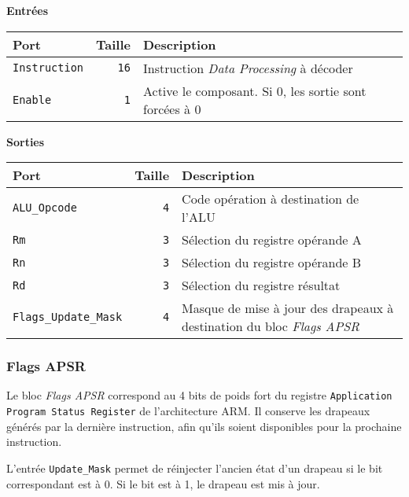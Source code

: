 
\textbf{Entrées}\\

\begin{tabular}{|l|r|l|}
\hline
\textbf{Port}		& \textbf{Taille} & \textbf{Description}\\
\hline

\texttt{Instruction}	& \texttt{16} & Instruction \textit{Data Processing} à décoder\\
\hline
\texttt{Enable}		&  \texttt{1} & Active le composant. Si 0, les sortie sont forcées à 0\\


\hline
\end{tabular}

\vspace{1em}
\textbf{Sorties}\\

\begin{tabular}{|l|r|l|}
\hline 
\textbf{Port} & \textbf{Taille} & \textbf{Description}\\
\hline

\texttt{ALU\_Opcode}		&  \texttt{4} & Code opération à destination de l'ALU\\
\hline
\texttt{Rm}			&  \texttt{3} & Sélection du registre opérande A\\
\hline
\texttt{Rn}			&  \texttt{3} & Sélection du registre opérande B\\
\hline
\texttt{Rd}			&  \texttt{3} & Sélection du registre résultat\\
\hline
\texttt{Flags\_Update\_Mask}	&  \texttt{4} & Masque de mise à jour des drapeaux à destination du bloc \textit{Flags APSR}\\

\hline
\end{tabular}




\subsubsection{Flags APSR}



Le bloc \textit{Flags APSR} correspond au 4 bits de poids fort du registre \texttt{Application Program Status Register} de l'architecture ARM. Il conserve les drapeaux générés par la dernière instruction, afin qu'ils soient disponibles pour la prochaine instruction.

L'entrée \texttt{Update\_Mask} permet de réinjecter l'ancien état d'un drapeau si le bit correspondant est à 0. Si le bit est à 1, le drapeau est mis à jour.

